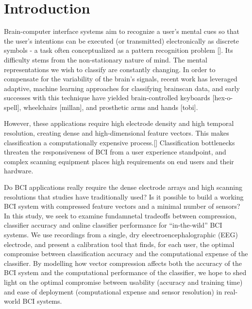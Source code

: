 \section{Introduction}

Brain-computer interface systems aim to recognize a user's mental cues so that the user's intentions can be executed (or transmitted) electronically as discrete symbols - a task often conceptualized as a pattern recognition problem []. Its difficulty stems from the non-stationary nature of mind. The mental representations we wish to classify are constantly changing. In order to compensate for the variability of the brain's signals, recent work has leveraged adaptive, machine learning approaches for classifying brainscan data, and early successes with this technique have yielded brain-controlled keyboards [hex-o-spell], wheelchairs [millan], and prosthetic arms and hands [tobi].

However, these applications require high electrode density and high temporal resolution, creating dense and high-dimensional feature vectors. This makes classification a computationally expensive process.[] Classification bottlenecks threaten the responsiveness of BCI from a user experience standpoint, and complex scanning equipment places high requirements on end users and their hardware. 

Do BCI applications really require the dense electrode arrays and high scanning resolutions that studies have traditionally used? Is it possible to build a working BCI system with compressed feature vectors and a minimal number of sensors? In this study, we seek to examine fundamnetal tradeoffs between compression, classifier accuracy and online classifier performance for ``in-the-wild'' BCI systems. We use recordings from a single, dry eleectroencephalographic (EEG) electrode, and present a calibration tool that finds, for each user, the optimal compromise between classification accuracy and the computational expense of the classifier. By modelling how vector compression affects both the accuracy of the BCI system and the computational performance of the classifier, we hope to shed light on the optimal compromise between usability (accuracy and training time) and ease of deployment (computational expense and sensor resolution) in real-world BCI systems.



